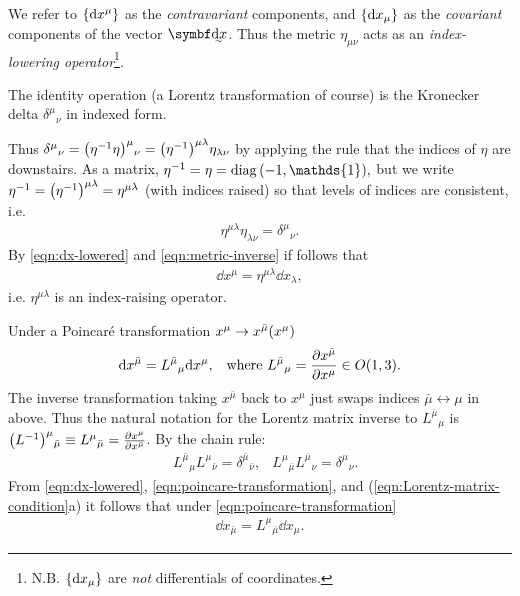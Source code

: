 We refer to $\qty{\dd x^\mu}$ as the \textit{contravariant} components, and $\qty{\dd x_\mu}$ as the \textit{covariant} components of the vector $\ts{ \dd x}$.
Thus the metric $\eta_{\mu\nu}$ acts as an \textit{index-lowering operator}\footnote{N.B. $\qty{ \dd x_\mu }$ are \textit{not} differentials of coordinates.}.

The identity operation (a Lorentz transformation of course) is the Kronecker delta $\delta^\mu{}_\nu$ in indexed form.

Thus $\delta^\mu{}_\nu = \qty(\eta^{-1} \eta)^\mu{}_\nu = \qty(\eta^{-1})^{\mu\lambda} \eta_{\lambda\nu}$ by applying the rule that the indices of $\eta$ are downstairs.
As a matrix, $\eta^{-1} = \eta = \operatorname{diag}\qty(-1, \mathds{1}),$
but we write $\eta^{-1} = \qty(\eta^{-1})^{\mu\lambda} = \eta^{\mu\lambda}$ (with indices raised) so that levels of indices are consistent, i.e.
\begin{align}
    \eta^{\mu\lambda} \eta_{\lambda \nu} = \delta^\mu{}_\nu.
    \label{eqn:metric-inverse}
\end{align}
By \eqref{eqn:dx-lowered} and \eqref{eqn:metric-inverse} if follows that
\begin{align}
    \dd x^\mu = \eta^{\mu\lambda} \dd x_\lambda, 
    \label{eqn:eta-raising}
\end{align}
i.e. $\eta^{\mu\lambda}$ is an index-raising operator.

Under a Poincar\'e transformation $x^\mu \to x^{\bar \mu} \qty(x^\mu)$
\begin{align}
    &\dd x^{\bar \mu} = L^{\bar \mu}{}_\mu \dd x^\mu, &\text{where } L^{\bar \mu}{}_\mu = \pdv{x^{\bar \mu}}{x^\mu} \in O(1,3).
    \label{eqn:poincare-transformation}
\end{align}
The inverse transformation taking $x^{\bar \mu}$ back to $x^\mu$ just swaps indices $\bar \mu \leftrightarrow \mu$ in above. 
Thus the natural notation for the Lorentz matrix inverse to $L^{\bar \mu}{}_\mu$ is $\qty(L^{-1})^\mu{}_{\bar \mu} \equiv L^\mu{}_{\bar \mu} = \pdv{x^\mu}{x^{\bar \mu}}$.
By the chain rule:
\begin{align}
    &L^{\bar \mu}{}_\mu L^\mu{}_{\bar \nu} = \delta^{\bar \mu}{}_{\bar \nu}, &L^\mu{}_{\bar \mu} L^{\bar \mu}{}_\nu = \delta^\mu{}_\nu.
\label{eqn:lorentz-chainrule}
\end{align}
From \eqref{eqn:dx-lowered}, \eqref{eqn:poincare-transformation}, and (\ref{eqn:Lorentz-matrix-condition}a) it follows that \exercise under \eqref{eqn:poincare-transformation}
\begin{align}
    \dd x_{\bar \mu} = L^\mu{}_{\bar \mu} \dd x_\mu.
    \label{eqn:dx-lowered-lorentz}
\end{align}


